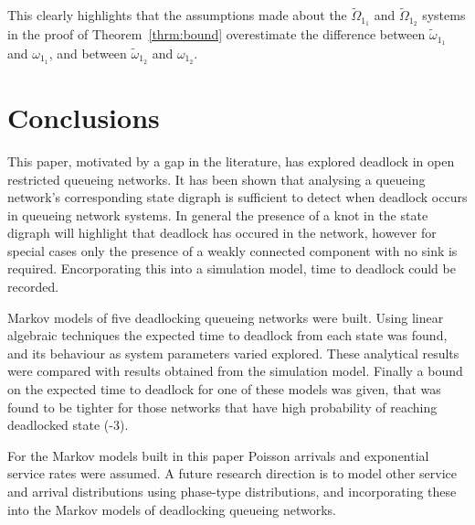 \documentclass{article}
\numberwithin{equation}{section}
\begin{document}
This clearly highlights that the assumptions made about the $\widetilde{\Omega}_{1_1}$ and $\widetilde{\Omega}_{1_2}$ systems in the proof of Theorem~\ref{thrm:bound} overestimate the difference between $\widetilde{\omega}_{1_1}$ and $\omega_{1_1}$, and between $\widetilde{\omega}_{1_2}$ and $\omega_{1_2}$.










\section{Conclusions}

This paper, motivated by a gap in the literature, has explored deadlock in open restricted queueing networks.
It has been shown that analysing a queueing network's corresponding state digraph is sufficient to detect when deadlock occurs in queueing network systems.
In general the presence of a knot in the state digraph will highlight that deadlock has occured in the network, however for special cases only the presence of a weakly connected component with no sink is required.
Encorporating this into a simulation model, time to deadlock could be recorded.

Markov models of five deadlocking queueing networks were built.
Using linear algebraic techniques the expected time to deadlock from each state was found, and its behaviour as system parameters varied explored.
These analytical results were compared with results obtained from the simulation model.
Finally a bound on the expected time to deadlock for one of these models was given, that was found to be tighter for those networks that have high probability of reaching deadlocked state (-3).

For the Markov models built in this paper Poisson arrivals and exponential service rates were assumed.
A future research direction is to model other service and arrival distributions using phase-type distributions, and incorporating these into the Markov models of deadlocking queueing networks.





\end{document}
